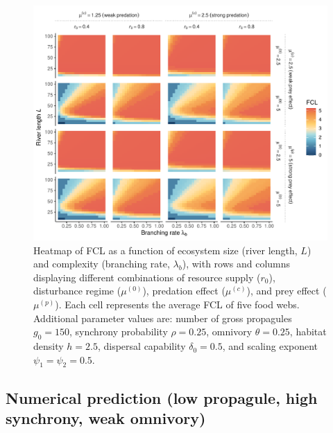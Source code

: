 \begin{figure}
\centering
\includegraphics{../data_fmt/fig_rho025_g150_theta025.pdf}
\caption{Heatmap of FCL as a function of ecosystem size (river length,
\(L\)) and complexity (branching rate, \(\lambda_b\)), with rows and
columns displaying different combinations of resource supply (\(r_0\)),
disturbance regime (\(\mu^{(0)}\)), predation effect (\(\mu^{(c)}\)),
and prey effect (\(\mu^{(p)}\)). Each cell represents the average FCL of
five food webs. Additional parameter values are: number of gross
propagules \(g_0=150\), synchrony probability \(\rho=0.25\), omnivory
\(\theta=0.25\), habitat density \(h=2.5\), dispersal capability
\(\delta_0=0.5\), and scaling exponent \(\psi_1=\psi_2=0.5\).}
\end{figure}

\newpage

\subsection{Numerical prediction (low propagule, high synchrony, weak
omnivory)}\label{numerical-prediction-low-propagule-high-synchrony-weak-omnivory}

